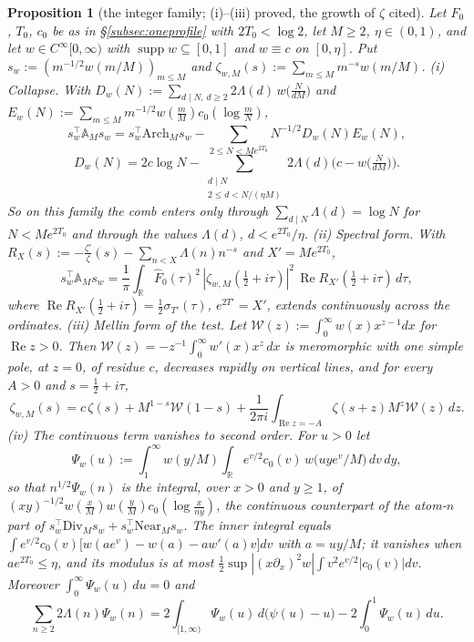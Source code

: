 \documentclass[11pt]{amsart}
\newtheorem{proposition}[theorem]{Proposition}
\theoremstyle{definition}
\theoremstyle{remark}
\newcommand{\R}{\mathbb R}
\newcommand{\Rel}{\operatorname{Re}}
\newcommand{\supp}{\operatorname{supp}}
\newcommand{\Fh}{\widehat F}
\begin{document}
\begin{proposition}[the integer family; (i)--(iii) proved, the growth of $\zeta$ cited]\label{prop:shape-family}
Let $F_0$, $T_0$, $c_0$ be as in \S\ref{subsec:oneprofile} with $2T_0<\log2$, let $M\ge2$, $\eta\in(0,1)$, and let $w\in C^\infty[0,\infty)$
with $\supp w\subseteq[0,1]$ and $w\equiv c$ on $[0,\eta]$. Put $s_w:=(m^{-1/2}w(m/M))_{m\le M}$ and
$\zeta_{w,M}(s):=\sum_{m\le M}m^{-s}w(m/M)$.
\emph{(i) Collapse.} With $D_w(N):=\sum_{d\mid N,\,d\ge2}2\Lambda(d)\,w\big(\frac N{dM}\big)$ and
$E_w(N):=\sum_{m\le M}m^{-1/2}w(\frac mM)c_0(\log\frac mN)$,
\[
s_w^\top\mathbb A_Ms_w=s_w^\top\mathrm{Arch}_Ms_w-\sum_{2\le N<Me^{2T_0}}N^{-1/2}D_w(N)E_w(N),
\]
\[
D_w(N)=2c\log N-\sum_{\substack{d\mid N\\2\le d<N/(\eta M)}}2\Lambda(d)\Big(c-w\big(\tfrac N{dM}\big)\Big).
\]
So on this family the comb enters only through $\sum_{d\mid N}\Lambda(d)=\log N$ for $N<Me^{2T_0}$ and through the values $\Lambda(d)$,
$d<e^{2T_0}/\eta$.
\emph{(ii) Spectral form.} With $R_X(s):=-\frac{\zeta'}{\zeta}(s)-\sum_{n<X}\Lambda(n)n^{-s}$ and $X'=Me^{2T_0}$,
\[
s_w^\top\mathbb A_Ms_w=\frac1\pi\int_\R\Fh_0(\tau)^2\,|\zeta_{w,M}(\tfrac12+i\tau)|^2\,\Rel R_{X'}(\tfrac12+i\tau)\,d\tau ,
\]
where $\Rel R_{X'}(\frac12+i\tau)=\frac12\sigma_{T'}(\tau)$, $e^{2T'}=X'$, extends continuously across the ordinates.
\emph{(iii) Mellin form of the test.} Let $\mathcal W(z):=\int_0^\infty w(x)x^{z-1}dx$ for $\Rel z>0$. Then
$\mathcal W(z)=-z^{-1}\int_0^\infty w'(x)x^z\,dx$ is meromorphic with one simple pole, at $z=0$, of residue $c$, decreases rapidly on
vertical lines, and for every $A>0$ and $s=\frac12+i\tau$,
\[
\zeta_{w,M}(s)=c\,\zeta(s)+M^{1-s}\mathcal W(1-s)+\frac1{2\pi i}\int_{\Rel z=-A}\zeta(s+z)M^z\mathcal W(z)\,dz .
\]
\emph{(iv) The continuous term vanishes to second order.} For $u>0$ let
\[
\Psi_w(u):=\int_1^\infty w(y/M)\int_\R e^{v/2}c_0(v)\,w\big(uye^v/M\big)\,dv\,dy ,
\]
so that $n^{1/2}\Psi_w(n)$ is the integral, over $x>0$ and $y\ge1$, of $(xy)^{-1/2}w(\frac xM)w(\frac yM)c_0(\log\frac x{ny})$, the continuous
counterpart of the atom-$n$ part of $s_w^\top\mathrm{Div}_Ms_w+s_w^\top\mathrm{Near}_Ms_w$. The inner integral equals
$\int e^{v/2}c_0(v)\big[w(ae^v)-w(a)-aw'(a)v\big]dv$ with $a=uy/M$; it vanishes when $ae^{2T_0}\le\eta$, and its modulus is at most
$\frac12\sup|(x\partial_x)^2w|\int v^2e^{v/2}|c_0(v)|dv$. Moreover $\int_0^\infty\Psi_w(u)\,du=0$ and
\[
\sum_{n\ge2}2\Lambda(n)\Psi_w(n)=2\int_{[1,\infty)}\Psi_w(u)\,d\big(\psi(u)-u\big)-2\int_0^1\Psi_w(u)\,du .
\]
\end{proposition}
\end{document}

